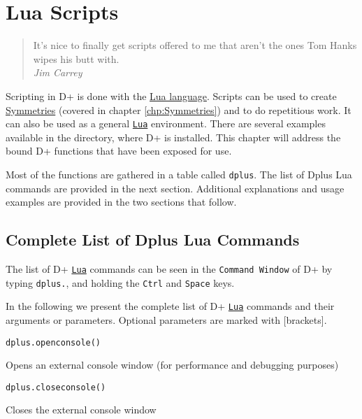 \documentclass[../D+Manual.tex]{subfiles}
\begin{document}
\chapter{Lua Scripts} \label{chp:scripts}

\begin{quote}
	It's nice to finally get scripts offered to me that aren't the ones Tom Hanks wipes his butt with.\\
	\hspace*{\fill} \textit{Jim Carrey}
\end{quote}


\lstset{style=Luastyle,}

Scripting in D+ is done with the \href{http://www.lua.org/}{Lua language}.
Scripts can be used to create \hyperref[chp:Symmetries]{Symmetries} (covered in chapter \ref{chp:Symmetries}) and to do repetitious work.
It can also be used as a general \href{http://www.lua.org/}{\texttt{Lua}} environment.
There are several examples available in the  directory, where D+ is installed.
This chapter will address the bound D+ functions that have been exposed for use.

Most of the functions are gathered in a table called \lstinline|dplus|. The list of Dplus Lua commands are provided in the next section. Additional explanations and usage examples are provided in the two sections that follow. 

\section{Complete List of Dplus Lua Commands }

The list of D+  \href{http://www.lua.org/}{\texttt{Lua}} commands can be seen in the \texttt{Command Window} of D+ by typing \texttt{dplus.}, and holding the \texttt{Ctrl} and \texttt{Space} keys.

In the following we present the complete list of D+ \href{http://www.lua.org/}{\texttt{Lua}} commands and their arguments or parameters. Optional parameters are marked with [brackets].


\begin{lstlisting}
dplus.openconsole()
\end{lstlisting}
Opens an external console window (for performance and debugging purposes)

\begin{lstlisting}
dplus.closeconsole()
\end{lstlisting}
Closes the external console window
\end{document}
